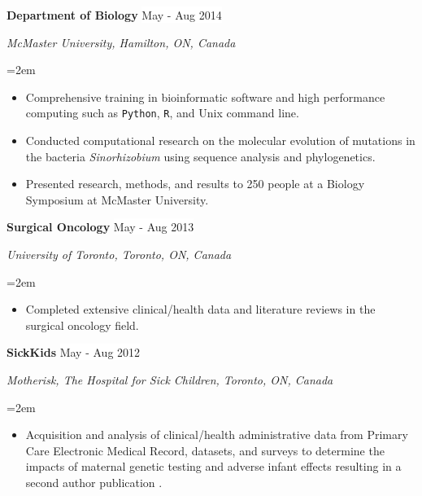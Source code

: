 \documentclass[paper=a4,fontsize=11pt]{scrartcl}	 			%
\newcommand{\NewPart}[1]{\section*{\uppercase{#1}}}
\newcommand{\EducationEntry}[4]{
		\noindent \textbf{#1} \hfill 					%
		\colorbox{White}{%
			\parbox{10em}{%
			\hfill\color{Black}#2}} \par				%
		\noindent \textit{#3} \par					%
		\noindent\hangindent=2em\hangafter=0 \small #4 	%
		\normalsize \par}
\newcommand{\WorkEntry}[4]{						%
		\noindent \textbf{#1} \hfill 					%
		\colorbox{White}{\color{Black}#2} \par		%
		\noindent \textit{#3} \par					%
		\noindent\hangindent=2em\hangafter=0 \small #4 	%
		\normalsize \par}
\newcommand{\WorkEntryF}[2]{						%
	 \textbf{#1} \hfill 					%
	\colorbox{White}{\color{Black}#2} \par}
\begin{document}
	\WorkEntry{Department of Biology}{May - Aug 2014}{McMaster University, Hamilton, ON, Canada}{
		\begin{itemize}
		\item Comprehensive training in bioinformatic software and high performance computing such as \texttt{Python}, \texttt{R}, and Unix command line. 
		\item Conducted computational research on the molecular evolution of mutations in the bacteria \textit{Sinorhizobium} using sequence analysis and phylogenetics.
		\item Presented research, methods, and results to 250 people at a Biology Symposium at McMaster University. 
		\end{itemize}}
	\WorkEntry{Surgical Oncology}{May - Aug 2013}{University of Toronto, Toronto, ON, Canada}{
		\begin{itemize}
			\setlength{\itemindent}{0.2in}
		\item Completed extensive clinical/health data and literature reviews in the surgical oncology field.
		\end{itemize}}
	\sloppy\WorkEntry{SickKids}{May - Aug 2012}{Motherisk, The Hospital for Sick Children, Toronto, ON, Canada}{
		\begin{itemize}
				\setlength{\itemindent}{0.2in}
		\item Acquisition and analysis of clinical/health administrative data from Primary Care Electronic Medical Record, datasets, and surveys to determine the impacts of maternal genetic testing and adverse infant effects resulting in a second author publication \cite{More:17}.
		\end{itemize}}

%
\end{document}
